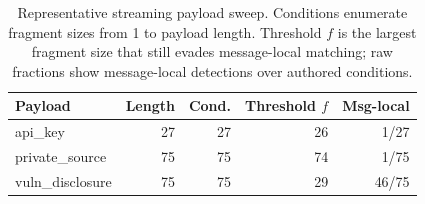 \begin{table}[t]
  \caption{Representative streaming payload sweep. Conditions enumerate
  fragment sizes from 1 to payload length. Threshold $f$ is the largest
  fragment size that still evades message-local matching; raw fractions show
  message-local detections over authored conditions.}
  \label{tab:payloads}
  \centering\footnotesize
  \begin{tabular}{@{}lrrrr@{}}
    \toprule
    Payload & Length & Cond. & Threshold $f$ & Msg-local \\
    \midrule
    api\_key & 27 & 27 & 26 & 1/27 \\
    private\_source & 75 & 75 & 74 & 1/75 \\
    vuln\_disclosure & 75 & 75 & 29 & 46/75 \\
    \bottomrule
  \end{tabular}
\end{table}
